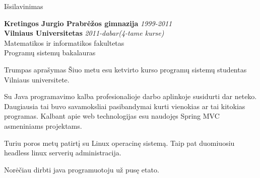 \documentclass[]{resume} %
\begin{document}

\begin{rSection}{Išsilavinimas}

{\bf Kretingos Jurgio Prabrėžos gimnazija} \hfill {\em 1999-2011} \\ 
{\bf Vilniaus Universitetas} \hfill {\em 2011-dabar(4-tame kurse)} \\ 
Matematikos ir informatikos fakultetas\\
Programų sistemų bakalauras\\

\end{rSection}


\begin{rSection}{Trumpas aprašymas}
Šiuo metu esu ketvirto kurso programų sistemų studentas Vilniaus universitete.

Su Java programavimo kalba profesionalioje darbo aplinkoje susidurti dar neteko.
Daugiausia tai buvo savamoksliai pasibandymai kurti vienokias ar tai kitokias
programas. Kalbant apie web technologijas esu naudojęs Spring MVC asmeniniams
projektams.

Turiu poros metų patirtį su Linux operacinę sistemą. Taip pat duomiuosiu headless linux serverių administracija.

Norėčiau dirbti java programuotoju už pusę etato. 
\end{rSection}

\end{document}
